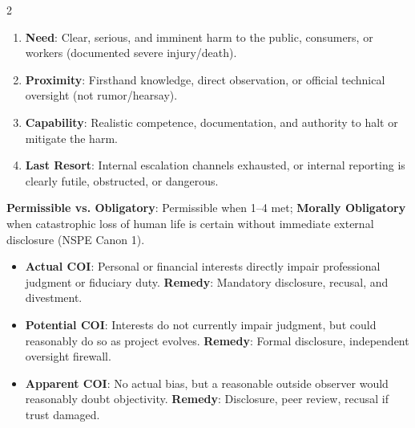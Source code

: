 \documentclass[9pt,a4paper]{extarticle}
\begin{document}
\begin{multicols}{2}
\begin{tcolorbox}[alertbox,title={3.3 Whistleblowing: 4 Conditions (Harris/Pritchard/Rabins)}]
\begin{enumerate}[leftmargin=10pt]
  \item \textbf{Need}: Clear, serious, and imminent harm to the public, consumers, or workers (documented severe injury/death).
  \item \textbf{Proximity}: Firsthand knowledge, direct observation, or official technical oversight (not rumor/hearsay).
  \item \textbf{Capability}: Realistic competence, documentation, and authority to halt or mitigate the harm.
  \item \textbf{Last Resort}: Internal escalation channels exhausted, or internal reporting is clearly futile, obstructed, or dangerous.
\end{enumerate}
\textbf{Permissible vs. Obligatory}: Permissible when 1--4 met; \textbf{Morally Obligatory} when catastrophic loss of human life is certain without immediate external disclosure (NSPE Canon 1).
\end{tcolorbox}

\begin{tcolorbox}[compact,colframe=secondary,title={3.4 Conflict of Interest (COI) Diagnostic}]
\begin{itemize}[leftmargin=9pt]
  \item \textbf{Actual COI}: Personal or financial interests directly impair professional judgment or fiduciary duty. \textbf{Remedy}: Mandatory disclosure, recusal, and divestment.
  \item \textbf{Potential COI}: Interests do not currently impair judgment, but could reasonably do so as project evolves. \textbf{Remedy}: Formal disclosure, independent oversight firewall.
  \item \textbf{Apparent COI}: No actual bias, but a reasonable outside observer would reasonably doubt objectivity. \textbf{Remedy}: Disclosure, peer review, recusal if trust damaged.
\end{itemize}
\end{tcolorbox}


\end{multicols}
\end{document}
